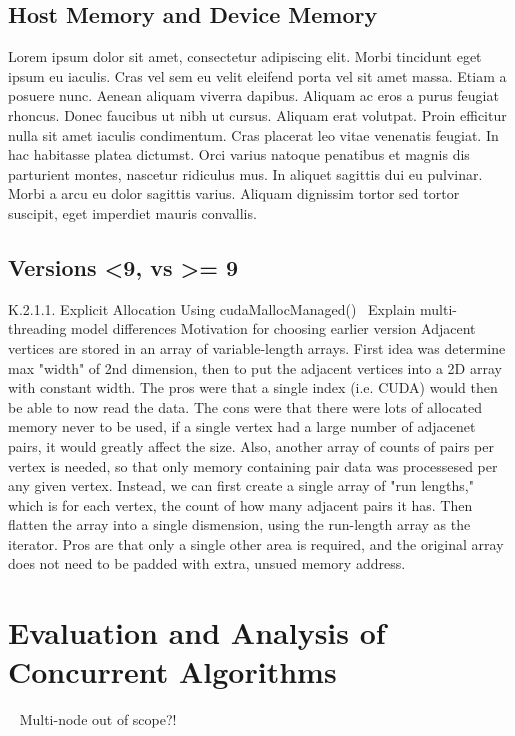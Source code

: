 \documentclass[openany]{book}
\begin{document}
\subsection{Host Memory and Device Memory}
Lorem ipsum dolor sit amet, consectetur adipiscing elit. Morbi tincidunt eget 
ipsum eu iaculis. Cras vel sem eu velit eleifend porta vel sit amet massa. Etiam 
a posuere nunc. Aenean aliquam viverra dapibus. Aliquam ac eros a purus feugiat 
rhoncus. Donec faucibus ut nibh ut cursus. Aliquam erat volutpat. Proin efficitur 
nulla sit amet iaculis condimentum. Cras placerat leo vitae venenatis feugiat. In 
hac habitasse platea dictumst. Orci varius natoque penatibus et magnis dis 
parturient montes, nascetur ridiculus mus. In aliquet sagittis dui eu pulvinar. 
Morbi a arcu eu dolor sagittis varius. Aliquam dignissim tortor sed tortor 
suscipit, eget imperdiet mauris convallis.~\cite[p.~00]{SourceNeeded}



\subsection{Versions <9, vs >= 9}
K.2.1.1. Explicit Allocation Using cudaMallocManaged()~\cite[p.~272]{CUDA18} 
Explain multi-threading model differences Motivation for choosing earlier 
version Adjacent vertices are stored in an array of variable-length arrays. 
First idea was determine max "width" of 2nd dimension, then to put the adjacent 
vertices into a 2D array with constant width. The pros were that a single index 
(i.e. CUDA) would then be able to now read the data.  The cons were that there 
were lots of allocated memory never to be used, if a single vertex had a large 
number of adjacenet pairs, it would greatly affect the size. Also, another 
array of counts of pairs per vertex is needed, so that only memory containing 
pair data was processesed per any given vertex. Instead, we can first create a 
single array of "run lengths," which is for each vertex, the count of how many 
adjacent pairs it has. Then flatten the array into a single dismension, using 
the run-length array as the iterator. Pros are that only a single other area is 
required, and the original array does not need to be padded with extra, unsued 
memory address.


\section{Evaluation and Analysis of Concurrent Algorithms}~\cite[p.~330]{Lang17}
Multi-node out of scope?!
\end{document}
